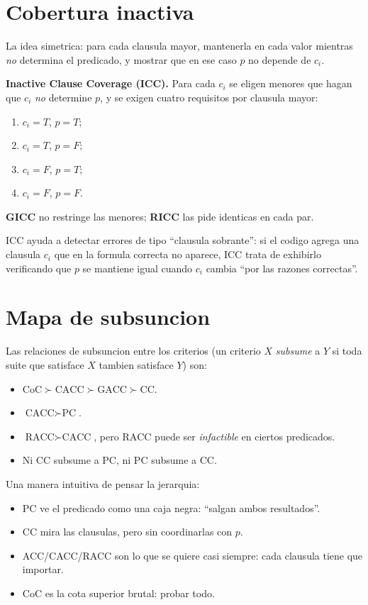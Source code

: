 \documentclass[12pt,a4paper]{article}
\begin{document}
\section{Cobertura inactiva}

La idea simetrica: para cada clausula mayor, mantenerla en cada valor mientras \emph{no}
determina el predicado, y mostrar que en ese caso $p$ no depende de $c_i$.

\begin{definicionbox}
\textbf{Inactive Clause Coverage (ICC).} Para cada $c_i$ se eligen menores que hagan que $c_i$
\emph{no} determine $p$, y se exigen cuatro requisitos por clausula mayor:
\begin{enumerate}
  \item $c_i = T$, $p = T$;
  \item $c_i = T$, $p = F$;
  \item $c_i = F$, $p = T$;
  \item $c_i = F$, $p = F$.
\end{enumerate}
\textbf{GICC} no restringe las menores; \textbf{RICC} las pide identicas en cada par.
\end{definicionbox}

ICC ayuda a detectar errores de tipo ``clausula sobrante'': si el codigo agrega una clausula
$c_i$ que en la formula correcta no aparece, ICC trata de exhibirlo verificando que $p$ se
mantiene igual cuando $c_i$ cambia ``por las razones correctas''.

\section{Mapa de subsuncion}

Las relaciones de subsuncion entre los criterios (un criterio $X$ \emph{subsume} a $Y$ si toda
suite que satisface $X$ tambien satisface $Y$) son:

\begin{itemize}
  \item $\text{CoC} \succ \text{CACC} \succ \text{GACC} \succ \text{CC}$.
  \item $\text{CACC} \succ \text{PC}$.
  \item $\text{RACC} \succ \text{CACC}$, pero $\text{RACC}$ puede ser \emph{infactible} en
  ciertos predicados.
  \item Ni CC subsume a PC, ni PC subsume a CC.
\end{itemize}

\begin{ideabox}
Una manera intuitiva de pensar la jerarquia:
\begin{itemize}
  \item PC ve el predicado como una caja negra: ``salgan ambos resultados''.
  \item CC mira las clausulas, pero sin coordinarlas con $p$.
  \item ACC/CACC/RACC son lo que se quiere casi siempre: cada clausula tiene que importar.
  \item CoC es la cota superior brutal: probar todo.
\end{itemize}
\end{ideabox}
\end{document}

